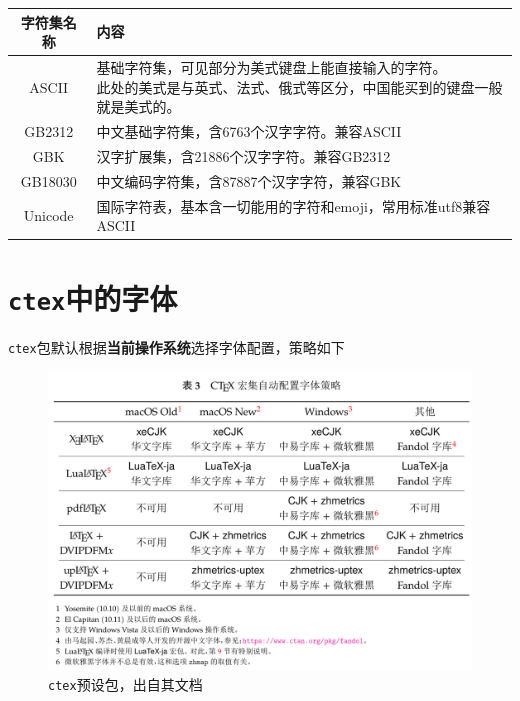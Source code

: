 \documentclass[10pt,openany]{book}
\begin{document}
\begin{sloppypar}
\begin{center}
    \begin{longtable}{cl}
        \textbf{字符集名称} & \textbf{内容}                            \\
        \hline
        \endfirsthead
        ASCII          & \makecell{基础字符集，可见部分为美式键盘上能直接输入的字符。    \\此处的美式是与英式、法式、俄式等区分，中国能买到的键盘一般就是美式的。}\\
        \hline
        GB2312         & 中文基础字符集，含6763个汉字字符。兼容ASCII             \\
        \hline
        GBK            & 汉字扩展集，含21886个汉字字符。兼容GB2312             \\
        \hline
        GB18030        & 中文编码字符集，含87887个汉字字符，兼容GBK              \\
        \hline
        Unicode        & 国际字符表，基本含一切能用的字符和emoji，常用标准utf8兼容ASCII \\
        \hline
    \end{longtable}
\end{center}

\section{\texttt{ctex}中的字体}

\texttt{ctex}包默认根据\textbf{当前操作系统}选择字体配置，策略如下

\begin{figure}[H]
    \centering
    \includegraphics[width=\linewidth]{data/ctex.png}
    \caption{\texttt{ctex}预设包，出自其文档}
\end{figure}


\end{sloppypar}
\end{document}

